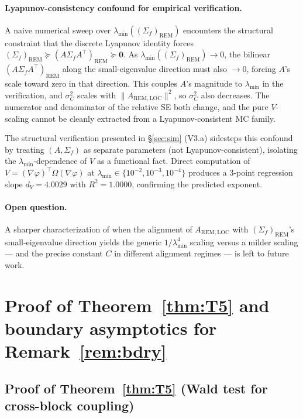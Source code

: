 \documentclass[11pt,letterpaper]{article}
\theoremstyle{remark}
\newcommand{\REM}{\mathrm{REM}}
\newcommand{\LOC}{\mathrm{LOC}}
\newcommand{\Sigmaf}{\Sigma_f}
\newcommand{\sigC}{\sigma^2_C}
\begin{document}
\paragraph{Lyapunov-consistency confound for empirical verification.} A naive numerical sweep over $\lambda_{\min}((\Sigmaf)_\REM)$ encounters the structural constraint that the discrete Lyapunov identity forces $(\Sigmaf)_\REM \succeq (A \Sigmaf A^\top)_\REM \succeq \mathbf{0}$. As $\lambda_{\min}((\Sigmaf)_\REM) \to 0$, the bilinear $(A \Sigmaf A^\top)_\REM$ along the small-eigenvalue direction must also $\to 0$, forcing $A$'s scale toward zero in that direction. This couples $A$'s magnitude to $\lambda_{\min}$ in the verification, and $\sigC$ scales with $\|A_{\REM, \LOC}\|^2$, so $\sigC$ also decreases. The numerator and denominator of the relative SE both change, and the pure $V$-scaling cannot be cleanly extracted from a Lyapunov-consistent MC family.

The structural verification presented in \S\ref{sec:sim} (V3.a) sidesteps this confound by treating $(A, \Sigmaf)$ as separate parameters (not Lyapunov-consistent), isolating the $\lambda_{\min}$-dependence of $V$ as a functional fact. Direct computation of $V = (\nabla \varphi)^\top \Omega (\nabla \varphi)$ at $\lambda_{\min} \in \{10^{-2}, 10^{-3}, 10^{-4}\}$ produces a $3$-point regression slope $d_V = 4.0029$ with $R^2 = 1.0000$, confirming the predicted exponent.

\paragraph{Open question.} A sharper characterization of when the alignment of $A_{\REM, \LOC}$ with $(\Sigmaf)_\REM$'s small-eigenvalue direction yields the generic $1/\lambda_{\min}^4$ scaling versus a milder scaling --- and the precise constant $C$ in different alignment regimes --- is left to future work.

\section{Proof of Theorem~\ref{thm:T5} and boundary asymptotics for Remark~\ref{rem:bdry}}\label{app:G}

\subsection{Proof of Theorem~\ref{thm:T5} (Wald test for cross-block coupling)}
\end{document}
